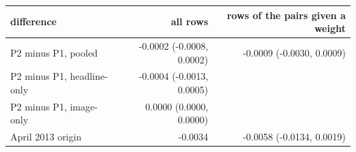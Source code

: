 \begin{tabular}{lrr}
\toprule
difference & all rows & rows of the pairs given a weight \\
\midrule
P2 minus P1, pooled & -0.0002 (-0.0008, 0.0002) & -0.0009 (-0.0030, 0.0009) \\
P2 minus P1, headline-only & -0.0004 (-0.0013, 0.0005) &  \\
P2 minus P1, image-only & 0.0000 (0.0000, 0.0000) &  \\
April 2013 origin & -0.0034 & -0.0058 (-0.0134, 0.0019) \\

\end{tabular}
